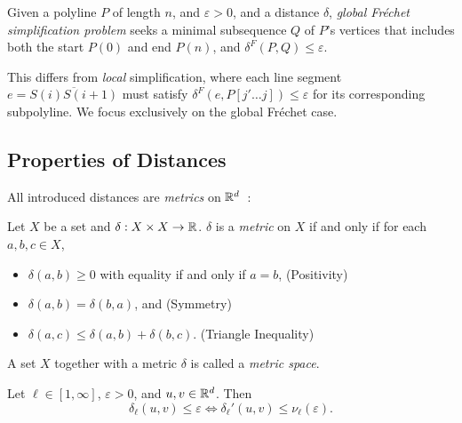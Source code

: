 \begin{definition}
	Given a polyline \(P\) of length \(n\), and \(\varepsilon > 0\), and a distance \(\delta\), \emph{global Fréchet simplification problem} seeks a minimal subsequence \(Q\) of \(P\)'s vertices that includes both the start \(P(0)\) and end \(P(n)\), and \(\delta^F(P, Q) \leq \varepsilon\).
\end{definition}

This differs from \emph{local} simplification, where each line segment \(e = \overline{S(i)S(i+1)}\) must satisfy \(\delta^F(e, P[j' \dots j]) \leq \varepsilon\) for its corresponding subpolyline. We focus exclusively on the global Fréchet case.

\subsection{Properties of Distances}
All introduced distances are \emph{metrics} on \(\mathbb{R}^d\)~\cite{metric_spaces}:

\begin{definition}\label{def:metric}
  Let \(X\) be a set and \(\delta:X\times X \to \mathbb{R}\). \(\delta\) is a \emph{metric} on \(X\) if and only if for each \(a, b, c \in X\), 
  \begin{itemize}
    \item \(\delta(a, b) \geq 0\) with equality if and only if \(a = b\), \hfill (Positivity)
    \item \(\delta(a, b) = \delta(b, a)\), and \hfill (Symmetry)
    \item \(\delta(a, c) \leq \delta(a, b) + \delta(b, c)\). \hfill (Triangle Inequality)
  \end{itemize}

  A set \(X\) together with a metric \(\delta\) is called a \emph{metric space}.
\end{definition}

\begin{observation}\label{obs:unnormalize}
  Let \(\ell \in [1, \infty]\), \(\varepsilon > 0\), and \(u, v \in \mathbb{R}^d\). Then 
    \[\delta_\ell(u, v) \leq \varepsilon \iff \delta_\ell'(u, v) \leq \nu_\ell(\varepsilon).\]
\end{observation}

